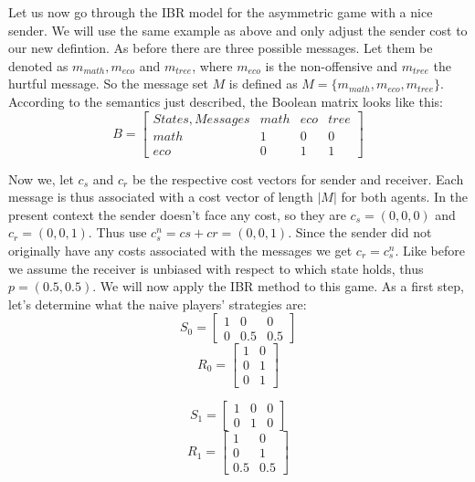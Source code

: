 \documentclass[10]{article}
\begin{document}
Let us now go through the IBR model for the asymmetric game with a nice sender. We will use the same example as above and only adjust the sender cost to our new defintion. As before there are three possible messages. Let them be denoted as $m_{math},m_{eco}$ and $m_{tree}$, where $m_{eco}$ is the non-offensive and $m_{tree}$ the hurtful message. So the message set $M$ is defined as $M=\{m_{math},m_{eco},m_{tree}\}$. According to the semantics just described, the Boolean matrix looks like this:\\
\begin{equation*}
B =
\begin{bmatrix}

States, Messages & math & eco & tree \\
math             & 1    & 0   & 0    \\
eco              & 0    & 1   & 1
\end{bmatrix}
\end{equation*}

Now we, let $c_s$ and $c_r$ be the respective cost vectors for sender and receiver. Each message is thus associated with a cost vector of length $|M|$ for both agents. In the present context the sender doesn't face any cost, so they are $c_s=(0,0,0)$ and $c_r=(0,0,1)$. Thus use $c_s^n=cs + cr=(0,0,1)$. Since the sender did not originally have any costs associated with the messages we get $c_r=c_s^n$. Like before we assume the receiver is unbiased with respect to which state holds, thus $p=(0.5,0.5)$.
We will now apply the IBR method to this game. As a first step, let's determine what the naive players' strategies are:\\
\begin{equation*}
S_0=
\begin{bmatrix}
1 & 0 & 0\\
0 & 0.5 & 0.5
\end{bmatrix}
\end{equation*}
\begin{equation*}
R_0=
\begin{bmatrix}
1 & 0\\
0 & 1\\
0 & 1
\end{bmatrix}
\end{equation*}

\begin{equation*}
S_1=
\begin{bmatrix}
1 & 0 & 0\\
0 & 1 & 0
\end{bmatrix}
\end{equation*}
\begin{equation*}
R_1=
\begin{bmatrix}
1 & 0\\
0 & 1\\
0.5 & 0.5
\end{bmatrix}
\end{equation*}
\end{document}

